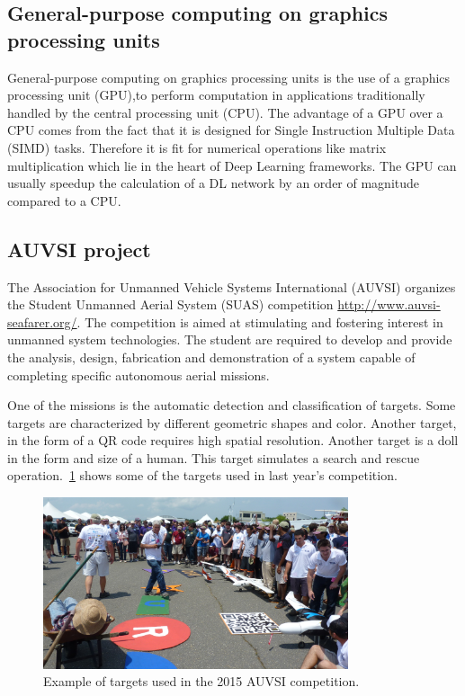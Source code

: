 \documentclass{article} %
\begin{document}
\subsection{General-purpose computing on graphics processing units}

General-purpose computing on graphics processing units is the use of a
graphics processing unit (GPU),to perform computation in applications traditionally
handled by the central processing unit (CPU). The advantage of a GPU over a
CPU comes from the fact that it is designed for Single Instruction Multiple Data (SIMD) tasks.
Therefore it is fit for numerical operations like matrix multiplication
which lie in the heart of Deep Learning frameworks. The GPU can usually speedup
the calculation of a DL network by an order of magnitude compared to a CPU.

\subsection{AUVSI project}

The Association for Unmanned Vehicle Systems International (AUVSI)
organizes the Student Unmanned Aerial System (SUAS) competition
\url{http://www.auvsi-seafarer.org/}. The competition is aimed  at
stimulating and fostering interest in unmanned system technologies.
The  student  are required  to  develop  and  provide  the  analysis,
design, fabrication and demonstration of a system capable of completing
specific autonomous aerial missions.

One of the missions is the automatic detection and classification of targets.
Some targets are characterized by different geometric shapes and color. Another
target, in the form of a QR code requires high spatial resolution. Another
target is a doll in the form and size of a human. This target simulates
a search and rescue operation.~\cref{fig:targets} shows
some of the targets used in last year's competition.
\begin{figure}[h]
	\centering
	\includegraphics[width=0.8\textwidth]{auvsi_targets}
	\caption{Example of targets used in the 2015 AUVSI competition.}
	\label{fig:targets}
\end{figure}
\end{document}
